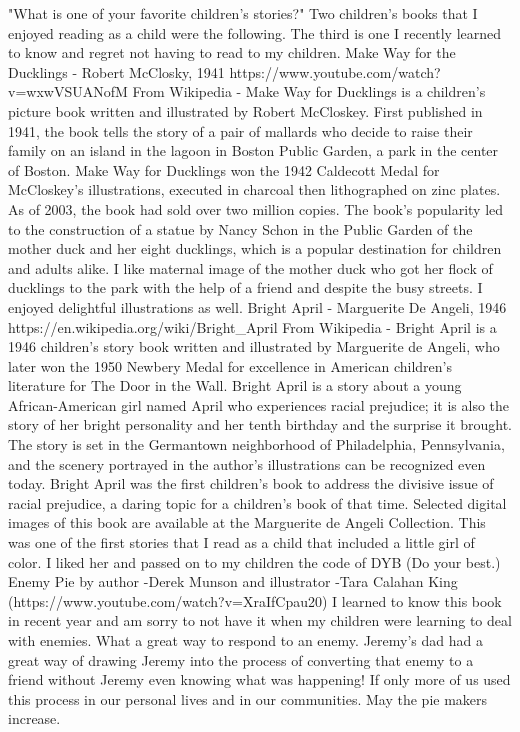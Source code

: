 "What is one of your favorite children's stories?"
Two children's books that I enjoyed reading as a child were the following. The third is one I recently learned to know and regret not having to read to my children.
Make Way for the Ducklings - Robert McClosky, 1941 https://www.youtube.com/watch?v=wxwVSUANofM 
From Wikipedia - Make Way for Ducklings is a children's picture book written and illustrated by Robert McCloskey. First published in 1941, the book tells the story of a pair of mallards who decide to raise their family on an island in the lagoon in Boston Public Garden, a park in the center of Boston.
Make Way for Ducklings won the 1942 Caldecott Medal for McCloskey's illustrations, executed in charcoal then lithographed on zinc plates. As of 2003, the book had sold over two million copies. The book's popularity led to the construction of a statue by Nancy Schon in the Public Garden of the mother duck and her eight ducklings, which is a popular destination for children and adults alike. 
I like maternal image of the mother duck who got her flock of ducklings to the park with the help of a friend and despite the busy streets. I enjoyed delightful illustrations as well.
Bright April - Marguerite De Angeli, 1946 https://en.wikipedia.org/wiki/Bright\_April 
From Wikipedia - Bright April is a 1946 children's story book written and illustrated by Marguerite de Angeli, who later won the 1950 Newbery Medal for excellence in American children's literature for The Door in the Wall. Bright April is a story about a young African-American girl named April who experiences racial prejudice; it is also the story of her bright personality and her tenth birthday and the surprise it brought. The story is set in the Germantown neighborhood of Philadelphia, Pennsylvania, and the scenery portrayed in the author's illustrations can be recognized even today.
Bright April was the first children's book to address the divisive issue of racial prejudice, a daring topic for a children's book of that time. Selected digital images of this book are available at the Marguerite de Angeli Collection. 
This was one of the first stories that I read as a child that included a little girl of color. I liked her and passed on to my children the code of DYB (Do your best.)
Enemy Pie by author -Derek Munson and illustrator -Tara Calahan King (https://www.youtube.com/watch?v=XraIfCpau20)
I learned to know this book in recent year and am sorry to not have it when my children were learning to deal with enemies. What a great way to respond to an enemy. Jeremy's dad had a great way of drawing Jeremy into the process of converting that enemy to a friend without Jeremy even knowing what was happening! If only more of us used this process in our personal lives and in our communities. May the pie makers increase.





